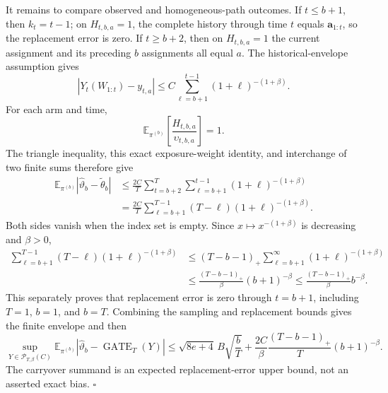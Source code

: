 It remains to compare observed and homogeneous-path outcomes. If \(t\le b+1\), then \(k_t=t-1\); on \(H_{t,b,a}=1\), the complete history through time \(t\) equals \(\mathbf a_{1:t}\), so the replacement error is zero. If \(t\ge b+2\), then on \(H_{t,b,a}=1\) the current assignment and its preceding \(b\) assignments all equal \(a\). The historical-envelope assumption gives
\[
|Y_t(W_{1:t})-y_{t,a}|
\le C\sum_{\ell=b+1}^{t-1}(1+\ell)^{-(1+\beta)}.
\]
For each arm and time,
\[
\mathbb E_{\pi^{(b)}}\left[\frac{H_{t,b,a}}{\upsilon_{t,b,a}}\right]=1.
\]
The triangle inequality, this exact exposure-weight identity, and interchange of two finite sums therefore give
\[
\begin{aligned}
\mathbb E_{\pi^{(b)}}|\widehat\vartheta_b-\widetilde\theta_b|
&\le\frac{2C}{T}\sum_{t=b+2}^T\sum_{\ell=b+1}^{t-1}(1+\ell)^{-(1+\beta)}\\
&=\frac{2C}{T}\sum_{\ell=b+1}^{T-1}(T-\ell)(1+\ell)^{-(1+\beta)}.
\end{aligned}
\]
Both sides vanish when the index set is empty. Since \(x\mapsto x^{-(1+\beta)}\) is decreasing and \(\beta>0\),
\[
\begin{aligned}
\sum_{\ell=b+1}^{T-1}(T-\ell)(1+\ell)^{-(1+\beta)}
&\le (T-b-1)_+\sum_{\ell=b+1}^{\infty}(1+\ell)^{-(1+\beta)}\\
&\le\frac{(T-b-1)_+}{\beta}(b+1)^{-\beta}
\le\frac{(T-b-1)_+}{\beta}b^{-\beta}.
\end{aligned}
\]
This separately proves that replacement error is zero through \(t=b+1\), including \(T=1\), \(b=1\), and \(b=T\). Combining the sampling and replacement bounds gives the finite envelope and then
\[
\sup_{Y\in\mathcal P_{T,\beta}(C)}
\mathbb E_{\pi^{(b)}}|\widehat\vartheta_b-\operatorname{GATE}_T(Y)|
\le \sqrt{8e+4}\,B\sqrt{\frac bT}
+\frac{2C}{\beta}\frac{(T-b-1)_+}{T}(b+1)^{-\beta}.
\]
The carryover summand is an expected replacement-error upper bound, not an asserted exact bias. \(\square\)